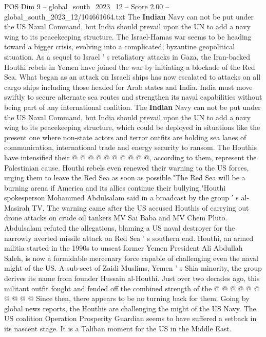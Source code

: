 \begin{textsample}{POS Dim 9 – global\_south\_2023\_12 – Score 2.00 – global\_south\_2023\_12/104661664.txt}  \label{ex:f9_pos_136}
The \textbf{Indian} Navy can not be put under the US Naval Command, but India should prevail upon the UN to add a navy wing to its peacekeeping structure.
The Israel-Hamas war seems to be heading toward a bigger crisis, evolving into a complicated, byzantine geopolitical situation.
As a sequel to Israel ' s retaliatory attacks in Gaza, the Iran-backed Houthi rebels in Yemen have joined the war by initiating a blockade of the Red Sea.
What began as an attack on Israeli ships has now escalated to attacks on all cargo ships including those headed for Arab states and India.
India must move swiftly to secure alternate sea routes and strengthen its naval capabilities without being part of any international coalition.
The \textbf{Indian} Navy can not be put under the US Naval Command, but India should prevail upon the UN to add a navy wing to its peacekeeping structure, which could be deployed in situations like the present one where non-state actors and terror outfits are holding sea lanes of communication, international trade and energy security to ransom.
The Houthis have intensified their @ @ @ @ @ @ @ @ @ @, according to them, represent the Palestinian cause.
Houthi rebels even renewed their warning to the US forces, urging them to leave the Red Sea as soon as possible."The Red Sea will be a burning arena if America and its allies continue their bullying,"Houthi spokesperson Mohammed Abdulsalam said in a broadcast by the group ' s al-Masirah TV.
The warning came after the US accused Houthis of carrying out drone attacks on crude oil tankers MV Sai Baba and MV Chem Pluto.
Abdulsalam refuted the allegations, blaming a US naval destroyer for the narrowly averted missile attack on Red Sea ' s southern end.
Houthi, an armed militia started in the 1990s to unseat former Yemen President Ali Abdullah Saleh, is now a formidable mercenary force capable of challenging even the naval might of the US.
A sub-sect of Zaidi Muslims, Yemen ' s Shia minority, the group derives its name from founder Hussain al-Houthi.
Just over two decades ago, this militant outfit fought and fended off the combined strength of the @ @ @ @ @ @ @ @ @ @ Since then, there appears to be no turning back for them.
Going by global news reports, the Houthis are challenging the might of the US Navy.
The US coalition Operation Prosperity Guardian seems to have suffered a setback in its nascent stage.
It is a Taliban moment for the US in the Middle East.

\end{textsample}
